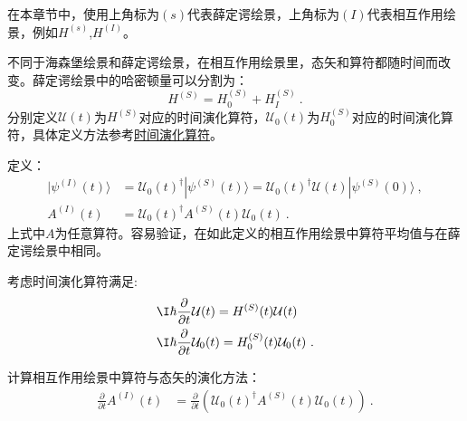 
在本章节中，使用上角标为$(s)$代表薛定谔绘景，上角标为$(I)$代表相互作用绘景，例如$H^{(s)}$,$H^{(I)}$。

\begin{definition}{}

不同于海森堡绘景和薛定谔绘景，在相互作用绘景里，态矢和算符都随时间而改变。薛定谔绘景中的哈密顿量可以分割为：
\begin{equation}
H^{(S)}=H^{(S)}_0+H^{(S)}_I~.
\end{equation}
分别定义$\mathcal U(t)$为$H^{(S)}$对应的时间演化算符，$\mathcal U_0(t)$为$H^{(S)}_0$对应的时间演化算符，具体定义方法参考\href{https://wuli.wiki/online/TOprt.html}{时间演化算符}。

定义：
\begin{align}
|\psi^{(I)}(t)\rangle&=\mathcal U_0(t)^\dagger|\psi^{(S)}(t)\rangle=\mathcal U_0(t)^\dagger\mathcal U(t)|\psi^{(S)}(0)\rangle~, \\
A^{(I)}(t)&=\mathcal U_0(t)^\dagger A^{(S)}(t)\mathcal U_0 (t)~.
\end{align}
上式中$A$为任意算符。容易验证，在如此定义的相互作用绘景中算符平均值与在薛定谔绘景中相同。

\end{definition}

考虑时间演化算符满足:
\begin{align}
&\I\hbar\frac{\partial}{\partial t}\mathcal{U}(t) = H^{(S)}(t)\mathcal{U}(t) \\
&\I\hbar\frac{\partial}{\partial t}\mathcal{U}_0(t) = H^{(S)}_0(t)\mathcal{U}_0(t)~.
\end{align}

计算相互作用绘景中算符与态矢的演化方法：
\begin{align}
\frac{\partial}{\partial t}A^{(I)}(t)&=\frac{\partial}{\partial t}\left(\mathcal U_0(t)^\dagger A^{(S)}(t)\mathcal U_0 (t)\right)~.
\end{align}



